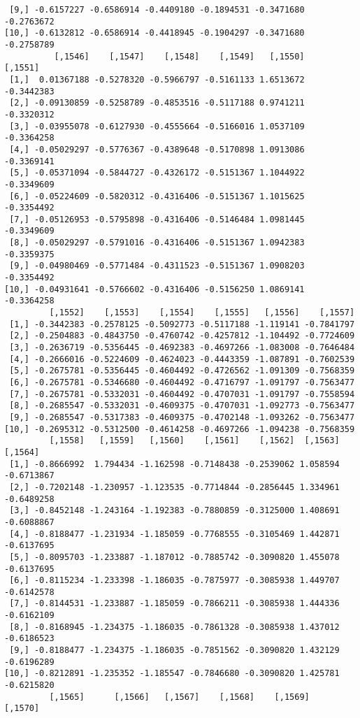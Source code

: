 \documentclass[
  letterpaper,
  DIV=11,
  numbers=noendperiod]{scrreprt}
\begin{document}
\begin{verbatim}
 [9,] -0.6157227 -0.6586914 -0.4409180 -0.1894531 -0.3471680 -0.2763672
[10,] -0.6132812 -0.6586914 -0.4418945 -0.1904297 -0.3471680 -0.2758789
          [,1546]    [,1547]    [,1548]    [,1549]   [,1550]    [,1551]
 [1,]  0.01367188 -0.5278320 -0.5966797 -0.5161133 1.6513672 -0.3442383
 [2,] -0.09130859 -0.5258789 -0.4853516 -0.5117188 0.9741211 -0.3320312
 [3,] -0.03955078 -0.6127930 -0.4555664 -0.5166016 1.0537109 -0.3364258
 [4,] -0.05029297 -0.5776367 -0.4389648 -0.5170898 1.0913086 -0.3369141
 [5,] -0.05371094 -0.5844727 -0.4326172 -0.5151367 1.1044922 -0.3349609
 [6,] -0.05224609 -0.5820312 -0.4316406 -0.5151367 1.1015625 -0.3354492
 [7,] -0.05126953 -0.5795898 -0.4316406 -0.5146484 1.0981445 -0.3349609
 [8,] -0.05029297 -0.5791016 -0.4316406 -0.5151367 1.0942383 -0.3359375
 [9,] -0.04980469 -0.5771484 -0.4311523 -0.5151367 1.0908203 -0.3354492
[10,] -0.04931641 -0.5766602 -0.4316406 -0.5156250 1.0869141 -0.3364258
         [,1552]    [,1553]    [,1554]    [,1555]   [,1556]    [,1557]
 [1,] -0.3442383 -0.2578125 -0.5092773 -0.5117188 -1.119141 -0.7841797
 [2,] -0.2504883 -0.4843750 -0.4760742 -0.4257812 -1.104492 -0.7724609
 [3,] -0.2636719 -0.5356445 -0.4692383 -0.4697266 -1.083008 -0.7646484
 [4,] -0.2666016 -0.5224609 -0.4624023 -0.4443359 -1.087891 -0.7602539
 [5,] -0.2675781 -0.5356445 -0.4604492 -0.4726562 -1.091309 -0.7568359
 [6,] -0.2675781 -0.5346680 -0.4604492 -0.4716797 -1.091797 -0.7563477
 [7,] -0.2675781 -0.5332031 -0.4604492 -0.4707031 -1.091797 -0.7558594
 [8,] -0.2685547 -0.5332031 -0.4609375 -0.4707031 -1.092773 -0.7563477
 [9,] -0.2685547 -0.5317383 -0.4609375 -0.4702148 -1.093262 -0.7563477
[10,] -0.2695312 -0.5312500 -0.4614258 -0.4697266 -1.094238 -0.7568359
         [,1558]   [,1559]   [,1560]    [,1561]    [,1562]  [,1563]    [,1564]
 [1,] -0.8666992  1.794434 -1.162598 -0.7148438 -0.2539062 1.058594 -0.6713867
 [2,] -0.7202148 -1.230957 -1.123535 -0.7714844 -0.2856445 1.334961 -0.6489258
 [3,] -0.8452148 -1.243164 -1.192383 -0.7880859 -0.3125000 1.408691 -0.6088867
 [4,] -0.8188477 -1.231934 -1.185059 -0.7768555 -0.3105469 1.442871 -0.6137695
 [5,] -0.8095703 -1.233887 -1.187012 -0.7885742 -0.3090820 1.455078 -0.6137695
 [6,] -0.8115234 -1.233398 -1.186035 -0.7875977 -0.3085938 1.449707 -0.6142578
 [7,] -0.8144531 -1.233887 -1.185059 -0.7866211 -0.3085938 1.444336 -0.6162109
 [8,] -0.8168945 -1.234375 -1.186035 -0.7861328 -0.3085938 1.437012 -0.6186523
 [9,] -0.8188477 -1.234375 -1.186035 -0.7851562 -0.3090820 1.432129 -0.6196289
[10,] -0.8212891 -1.235352 -1.185547 -0.7846680 -0.3090820 1.425781 -0.6215820
         [,1565]      [,1566]   [,1567]    [,1568]    [,1569]    [,1570]

\end{verbatim}
\end{document}
